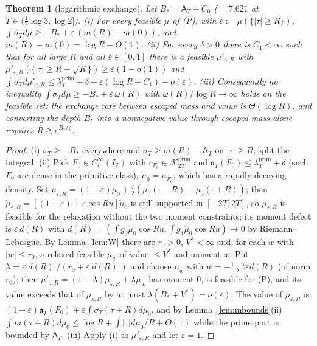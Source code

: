 \documentclass[11pt]{amsart}
\newtheorem{theorem}{Theorem}[section]
\theoremstyle{definition}
\theoremstyle{remark}
\newcommand{\Kp}{\mathcal K^{\mathrm{prim}}_{2T}}
\newcommand{\IT}{I_T}
\newcommand{\lamP}{\lambda^{\mathrm{prim}}_T}
\newcommand{\sT}{\sigma_T}
\newcommand{\Aconst}{\mathsf A_T}
\begin{document}
\begin{theorem}[logarithmic exchange]\label{thm:Vp}
Let $B_*=\Aconst-C_0$ ($=7.621$ at $T\in(\frac12\log3,\log2]$).
\emph{(i)} For every feasible $\mu$ of (P), with $\varepsilon:=\mu(\{|\tau|\ge R\})$,
$\int\sT d\mu\ge-B_*+\varepsilon\,(m(R)-m(0))$, and $m(R)-m(0)=\log R+O(1)$.
\emph{(ii)} For every $\delta>0$ there is $C_1<\infty$ such that for all large $R$ and all
$\varepsilon\in[0,1]$ there is a feasible $\mu'_{\varepsilon,R}$ with
$\mu'_{\varepsilon,R}(\{|\tau|\ge R-\sqrt R\})\ge\varepsilon(1-o(1))$ and
$\int\sT d\mu'_{\varepsilon,R}\le\lamP+\delta+\varepsilon(\log R+C_1)+o(\varepsilon)$.
\emph{(iii)} Consequently no inequality $\int\sT d\mu\ge-B_*+\varepsilon\,\omega(R)$ with
$\omega(R)/\log R\to\infty$ holds on the feasible set: the exchange rate between escaped mass and
value is $\Theta(\log R)$, and converting the depth $B_*$ into a nonnegative value through escaped
mass alone requires $R\gtrsim e^{B_*/\varepsilon}$.
\end{theorem}
\begin{proof}
(i) $\sT\ge-B_*$ everywhere and $\sT\ge m(R)-\Aconst$ on $|\tau|\ge R$; split the integral.
(ii) Pick $F_0\in C_c^\infty(\IT)$ with $c_{F_0}\in\Kp$ and $\mathfrak a_T(F_0)\le\lamP+\delta$
(such $F_0$ are dense in the primitive class), $\mu_0=\mu_{F_0}$, which has a rapidly decaying
density. Set $\mu_{\varepsilon,R}=(1-\varepsilon)\mu_0+\frac\varepsilon2(\mu_0(\cdot-R)+\mu_0(\cdot+R))$;
then $\check\mu_{\varepsilon,R}=[(1-\varepsilon)+\varepsilon\cos Ru]\check\mu_0$ is still supported in
$[-2T,2T]$, so $\mu_{\varepsilon,R}$ is feasible for the relaxation without the two moment
constraints; its moment defect is $\varepsilon\,d(R)$ with $d(R)=(\int g_0\check\mu_0\cos Ru,\int g_1\check\mu_0\cos Ru)\to0$
by Riemann--Lebesgue. By Lemma~\ref{lem:W} there are $r_0>0$, $V^*<\infty$ and, for each $w$
with $|w|\le r_0$, a relaxed-feasible $\mu_w$ of value $\le V^*$ and moment $w$. Put
$\lambda=\varepsilon|d(R)|/(r_0+\varepsilon|d(R)|)$ and choose $\mu_w$ with
$w=-\frac{1-\lambda}\lambda\varepsilon d(R)$ (of norm $r_0$); then
$\mu'_{\varepsilon,R}=(1-\lambda)\mu_{\varepsilon,R}+\lambda\mu_w$ has moment $0$, is feasible for
(P), and its value exceeds that of $\mu_{\varepsilon,R}$ by at most
$\lambda(B_*+V^*)=o(\varepsilon)$. The value of $\mu_{\varepsilon,R}$ is
$(1-\varepsilon)\mathfrak a_T(F_0)+\varepsilon\int\sT(\tau\pm R)d\mu_0$, and by
Lemma~\ref{lem:mbounds}(ii) $\int m(\tau+R)d\mu_0\le\log R+\int|\tau|d\mu_0/R+O(1)$ while the prime
part is bounded by $\Aconst$. (iii) Apply (i) to $\mu'_{\varepsilon,R}$ and let $\varepsilon=1$.
\end{proof}
\end{document}
